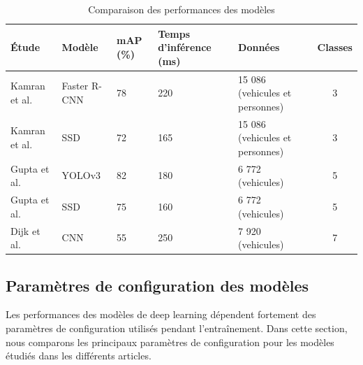 \begin{table}[H]
    \centering
    \begin{tabularx}{\textwidth}{|p{3.1cm}|p{2.1cm}|p{1.1cm}|p{2.2cm}|X|c|}
        \hline
        \textbf{Étude}                  & \textbf{Modèle} & \textbf{mAP (\%)} & \textbf{Temps d'inférence (ms)} & \textbf{Données}                & \textbf{Classes} \\ \hline
        Kamran et al. \cite{kamran2020} & Faster R-CNN    & 78                & 220                             & 15 086 (vehicules et personnes) & 3                \\ \hline
        Kamran et al. \cite{kamran2020} & SSD             & 72                & 165                             & 15 086 (vehicules et personnes) & 3                \\ \hline
        Gupta et al. \cite{gupta2021}   & YOLOv3          & 82                & 180                             & 6 772  (vehicules)              & 5                \\ \hline
        Gupta et al. \cite{gupta2021}   & SSD             & 75                & 160                             & 6 772  (vehicules)              & 5                \\ \hline
        Dijk et al. \cite{spie2020}     & CNN             & 55                & 250                             & 7 920  (vehicules)              & 7                \\ \hline
    \end{tabularx}
    \caption{Comparaison des performances des modèles}
    \label{tab:comparaison}
\end{table}

\subsection{Paramètres de configuration des modèles}

Les performances des modèles de deep learning dépendent fortement des paramètres de configuration utilisés pendant l'entraînement. Dans cette section, nous comparons les principaux paramètres de configuration pour les modèles étudiés dans les différents articles.

